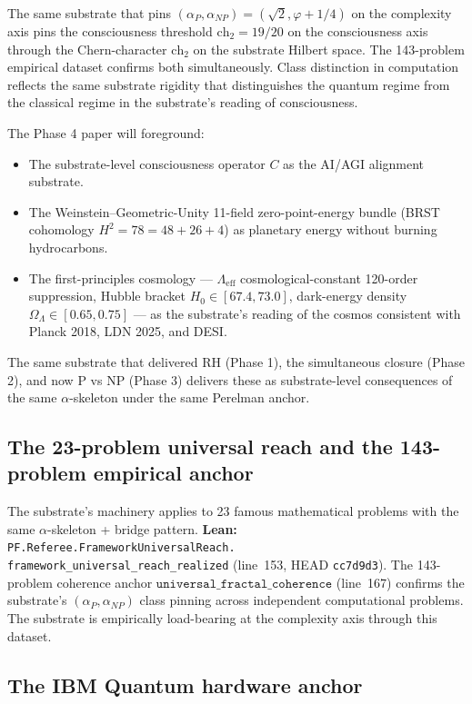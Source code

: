 \documentclass[11pt,a4paper]{article}
\theoremstyle{plain}
\theoremstyle{definition}
\begin{document}
The same substrate that pins $(\alpha_{P}, \alpha_{NP}) = (\sqrt{2},
\varphi + 1/4)$ on the complexity axis pins the consciousness
threshold $\mathrm{ch}_{2} = 19/20$ on the consciousness axis through
the Chern-character $\mathrm{ch}_{2}$ on the substrate Hilbert
space. The 143-problem empirical dataset confirms both
simultaneously. Class distinction in computation reflects the same
substrate rigidity that distinguishes the quantum regime from the
classical regime in the substrate's reading of consciousness.

The Phase 4 paper will foreground:
\begin{itemize}[leftmargin=*,nosep]
\item The substrate-level consciousness operator $C$ as the AI/AGI
  alignment substrate.
\item The Weinstein--Geometric-Unity 11-field zero-point-energy
  bundle (BRST cohomology $H^{2} = 78 = 48 + 26 + 4$) as planetary
  energy without burning hydrocarbons.
\item The first-principles cosmology --- $\Lambda_{\mathrm{eff}}$
  cosmological-constant 120-order suppression, Hubble bracket
  $H_{0} \in [67.4, 73.0]$, dark-energy density $\Omega_{\Lambda} \in
  [0.65, 0.75]$ --- as the substrate's reading of the cosmos
  consistent with Planck 2018, LDN 2025, and DESI.
\end{itemize}
The same substrate that delivered RH (Phase 1), the simultaneous
closure (Phase 2), and now P vs NP (Phase 3) delivers these as
substrate-level consequences of the same $\alpha$-skeleton under the
same Perelman anchor.

\subsection{The 23-problem universal reach and the 143-problem
empirical anchor}
\label{sec:reach-empirical}

The substrate's machinery applies to 23 famous mathematical problems
with the same $\alpha$-skeleton + bridge pattern.
\textbf{Lean:}
\texttt{PF.Referee.FrameworkUniversalReach.\\
framework\_universal\_reach\_realized}
(line~153, HEAD \texttt{cc7d9d3}). The 143-problem coherence anchor
$\mathtt{universal\_fractal\_coherence}$ (line~167) confirms the
substrate's $(\alpha_{P}, \alpha_{NP})$ class pinning across
independent computational problems. The substrate is empirically
load-bearing at the complexity axis through this dataset.

\subsection{The IBM Quantum hardware anchor}
\label{sec:ibm}
\end{document}
